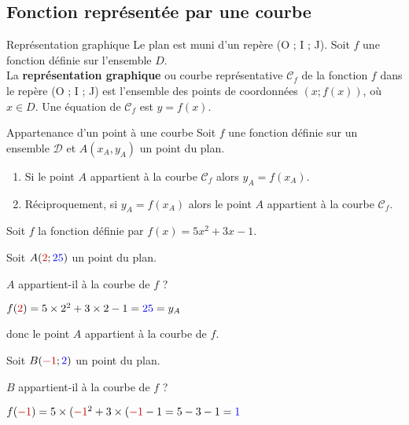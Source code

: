 \begin{pageCours}

\subsection{Fonction représentée par une courbe}


\begin{DefT}{Représentation graphique}
Le plan est muni d'un repère (O ; I ; J). Soit $f$ une fonction définie sur l'ensemble $D$.\\
La \textbf{représentation graphique} ou courbe représentative $\mathscr{C}_f$ de la fonction $f$ dans le repère (O ; I ; J) est l'ensemble des points de coordonnées $(x ; f (x))$, où $x \in D$. Une équation de $\mathscr{C}_f$ est $y=f(x)$.
\end{DefT}

\begin{PpT}{Appartenance d'un point à une courbe}
Soit $f$ une fonction définie sur un ensemble $\mathcal{D}$ et $A(x_A,y_A)$ un point du plan.
\begin{enumerate}
\item Si le point $A$ appartient à la courbe $\mathscr{C}_f$ alors $y_A=f(x_A)$.
\item Réciproquement, si $y_A=f(x_A)$ alors le point $A$ appartient à la courbe $\mathscr{C}_f$. 
\end{enumerate}
\end{PpT}

\begin{Ex} 

Soit $f$ la fonction définie par $f(x)=5x^2+3x-1$.

\begin{minipage}{0.5\linewidth} 
Soit $A({\color{red}2};{\color{blue}25})$ un point du plan. 

$A$ appartient-il à la courbe de $f$ ?

$f({\color{red}2})=5\times 2^2+3\times 2-1={\color{blue}25}=y_A$ 

donc le point $A$ appartient à la courbe de $f$.  
\end{minipage}
\begin{minipage}{0.5\linewidth} 
Soit $B({\color{red}-1};{\color{blue}2})$ un point du plan.  

$B$ appartient-il à la courbe de $f$ ?

$f({\color{red}-1})=5\times ({\color{red}-1}^2+3\times ({\color{red}-1}-1=5-3-1={\color{blue}1}$ 


\end{minipage}
\end{Ex}
\end{pageCours}
